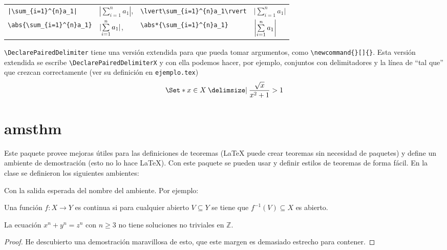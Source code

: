 \begin{tabular}{llll}
  \verb!|\sum_{i=1}^{n}a_1|! & \(|\sum\limits_{i=1}^{n}a_1|\), &
  \verb|\lvert\sum_{i=1}^{n}a_1\rvert| &
  \(\lvert\sum\limits_{i=1}^{n}a_1\rvert \) \\[4ex]
  \verb|\abs{\sum_{i=1}^{n}a_1}| & \(\abs{\sum\limits_{i=1}^{n}a_1}\), &
  \verb|\abs*{\sum_{i=1}^{n}a_1}| & \(\abs*{\sum\limits_{i=1}^{n}a_1}\)
\end{tabular}

\verb|\DeclarePairedDelimiter| tiene una versión extendida para que pueda
tomar argumentos, como \verb|\newcommand{}[]{}|. Esta versión extendida se
escribe \verb|\DeclarePairedDelimiterX| y con ella podemos hacer, por
ejemplo, conjuntos  con delimitadores y la línea de \enquote{tal que} que
crezcan correctamente (ver su definición en \texttt{ejemplo.tex})
\[
  \Set*{ x \in X \given \frac{\sqrt{x}}{x^2+1} > 1 }
\]


\section{amsthm}
Este paquete provee mejoras útiles para las definiciones de teoremas
(\LaTeX{} puede crear teoremas sin necesidad de paquetes) y
define un ambiente de demostración (esto no lo hace \LaTeX{}). Con este
paquete se pueden usar y definir estilos de teoremas de forma fácil. En la clase se definieron los siguientes ambientes:
\begin{center}
\end{center}
Con la salida esperada del nombre del ambiente. Por ejemplo:

\begin{definicion}
  Una función \(f\colon X\to Y\) es continua si para cualquier abierto
  \(V\subseteq Y\) se tiene que \(f^{-1}(V)\subseteq X\) es abierto.
\end{definicion}

\begin{teorema}[Fermat]%
\label{teo:fermat}
  La ecuación \(x^n + y^n = z^n\) con \(n\geq 3\) no tiene soluciones no triviales en \(\mathbb{Z}\).
\end{teorema}
\begin{proof}
  He descubierto una demostración maravillosa de esto, que este margen es
  demasiado estrecho para contener.
\end{proof}

